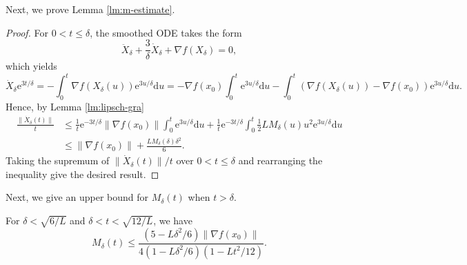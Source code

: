\documentclass[twoside,11pt]{article}
\newcommand{\der}[1]{\dot #1}
\newcommand{\dder}[1]{\ddot #1}
\newcommand{\e}[1]{\mathrm{e}^{#1}}
\newcommand{\norm}[1]{\|#1\|}
\newcommand{\inverse}[1]{\frac{1}{#1}}
\renewcommand{\d}{{\mathrm{d}}}
\def\half{\frac{1}{2}}
\begin{document}
Next, we prove Lemma \ref{lm:m-estimate}.
\begin{proof}
For $0 < t \le \delta$, the smoothed ODE takes the form
$$\dder{X_{\delta}} + \frac{3}{\delta}\der{X_{\delta}} + \nabla f(X_{\delta}) = 0,$$
which yields
\begin{equation}\nonumber
\der{X_{\delta}}\e{3t/\delta} = -\int^t_0\nabla f(X_{\delta}(u))\e{3u/\delta}\d u = -\nabla f(x_0)\int^t_0\e{3u/\delta}\d u - \int^t_0(\nabla f(X_{\delta}(u)) - \nabla f(x_0))\e{3u/\delta}\d u.
\end{equation}
Hence, by Lemma \ref{lm:lipsch-gra}
\begin{equation}\nonumber
\begin{aligned}
\frac{\norm{\der{X_{\delta}}(t)}}{t} &\le \inverse{t}\e{-3t/\delta}\norm{\nabla f(x_0)}\int^t_0\e{3u/\delta}\d u + \inverse{t}\e{-3t/\delta}\int^t_0\half LM_{\delta}(u)u^2\e{3u/\delta}\d u\\
&\le \norm{\nabla f(x_0)} + \frac{LM_{\delta}(\delta)\delta^2}{6}.
\end{aligned}  
\end{equation}
Taking the supremum of $\norm{\der{X_{\delta}}(t)}/t$ over $0 < t \le \delta$ and rearranging the inequality give the desired result.
\end{proof}
Next, we give an upper bound for $M_{\delta}(t)$ when $t > \delta$.
\begin{lemma}\label{lm:m-estimate-s}
For $\delta < \sqrt{6/L}$ and $\delta < t < \sqrt{12/L}$, we have
\begin{equation}\nonumber
M_{\delta}(t) \le \frac{(5-L\delta^2/6)\norm{\nabla f(x_0)}}{4(1-L\delta^2/6)(1-Lt^2/12)}.
\end{equation}
\end{lemma}
\end{document}
